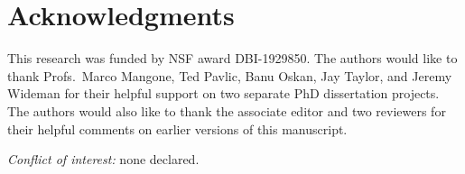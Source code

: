 \documentclass[12pt,letterpaper]{article}
\begin{document}

\section*{Acknowledgments}

This research was funded by NSF award DBI-1929850.
%
The authors would like to thank Profs.\ Marco Mangone, Ted Pavlic, Banu Oskan, Jay Taylor, and Jeremy Wideman for their helpful support on two separate PhD dissertation projects. The authors would also like to thank the associate editor and two reviewers for their helpful comments on earlier versions of this manuscript.

\noindent \textit{Conflict of interest:} none declared.

%
\setlength{\bibhang}{0pt}


\nolinenumbers
\end{document}
